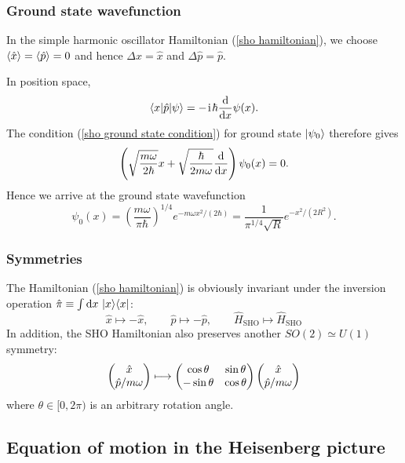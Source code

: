 \subsubsection{Ground state wavefunction}
In the simple harmonic oscillator Hamiltonian (\ref{sho hamiltonian}), we choose $\langle{\hat x}\rangle=\langle{\hat p}\rangle=0$ and hence $\Delta\hat x=\hat x$ and $\Delta\hat p=\hat p$. 

In position space,
\begin{equation}
 \langle{x}|\hat p|{\psi}\rangle
 =-\hspace{1pt}\mathrm{i}\hspace{1pt}\hbar\frac{\mathrm{d}{}}{\mathrm{d} x}\psi(x).
\end{equation}
The condition (\ref{sho ground state condition}) for ground state $|{\psi_0}\rangle$ therefore gives
\begin{equation}
 \left(\sqrt{\frac{m\omega}{2\hbar}}x
 +\sqrt{\frac{\hbar}{2m\omega}}\frac{\mathrm{d}{}}{\mathrm{d} x}\right)
 \psi_0(x)=0.
\end{equation}
Hence we arrive at the ground state wavefunction
\begin{equation}
 \boxed{
 \psi_0(x)=\left(\frac{m\omega}{\pi\hbar}\right)^{1/4}
 e^{-m\omega x^2/(2\hbar)}
 =\frac{1}{\pi^{1/4}\sqrt R}e^{-x^2/(2R^2)}.}
\end{equation}

\subsubsection{Symmetries}

The Hamiltonian (\ref{sho hamiltonian}) is obviously invariant under the inversion operation $\hat\pi\equiv\int\mathrm{d}{x}~|x\rangle\langle x|$:
\begin{equation}
 \hat x\longmapsto-\hat x,
 \qquad
 \hat p\longmapsto-\hat p,
 \qquad
 \hat H_{\text{SHO}}\longmapsto\hat H_{\text{SHO}}
\end{equation}
In addition, the SHO Hamiltonian also preserves another $SO(2)\simeq U(1)$ symmetry:
\begin{align}
    \begin{pmatrix}\hat x\\ \hat p/m\omega\end{pmatrix} \longmapsto \begin{pmatrix}\cos\theta&\sin\theta\\-\sin\theta&\cos\theta\end{pmatrix} \begin{pmatrix}\hat x\\ \hat p/m\omega\end{pmatrix}
\end{align}
where $\theta\in[0,2\pi)$ is an arbitrary rotation angle. 

\subsection{Equation of motion in the Heisenberg picture}

